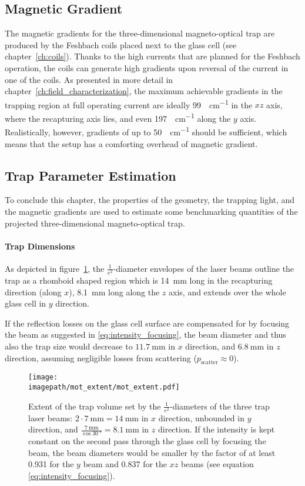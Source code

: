 \subsection*{Magnetic Gradient}
The magnetic gradients for the three-dimensional magneto-optical trap are produced by the Feshbach coils placed next to the glass cell (see chapter~\ref{ch:coils}). Thanks to the high currents that are planned for the Fesh\-bach operation, the coils can generate high gradients upon reversal of the current in one of the coils. As presented in more detail in chapter~\ref{ch:field_characterization}, the maximum achievable gradients in the trapping region at full operating current are ideally \SI{99}{\gauss\per\centi\meter} in the $xz$ axis, where the recapturing axis lies, and even \SI{197}{\gauss\per\centi\meter} along the $y$ axis. Realistically, however, gradients of up to \SI{50}{\gauss\per\centi\meter} should be sufficient, which means that the setup has a comforting overhead of magnetic gradient.

\subsection*{Trap Parameter Estimation}
To conclude this chapter, the properties of the geometry, the trapping light, and the magnetic gradients are used to estimate some benchmarking quantities of the projected three-dimensional magneto-optical trap.

\paragraph{Trap Dimensions}
As depicted in figure~\ref{fig:mot_extent}, the  $\frac{1}{e^2}$-diameter envelopes of the laser beams outline the trap as a rhomboid shaped region which is \SI[]{14}{\milli\meter} long in the recapturing direction (along $x$), \SI[]{8.1}{\milli\meter} long along the $z$ axis, and extends over the whole glass cell in $y$ direction.

If the reflection losses on the glass cell surface are compensated for by focusing the beam as suggested in \eqref{eq:intensity_focusing}, the beam diameter and thus also the trap size would decrease to $\SI[]{11.7}{\milli\meter}$ in $x$ direction, and $\SI[]{6.8}{\milli\meter}$ in $z$ direction, assuming negligible losses from scattering ($p_\text{scatter} \approx 0$).

\begin{figure}
    \centering
    \texttt{[image: \\imagepath/mot\_extent/mot\_extent.pdf]}
    \caption{Extent of the trap volume set by the $\frac{1}{e^2}$-diameters of the three trap laser beams: $2\cdot \SI[]{7}{\milli\meter} = \SI[]{14}{\milli\meter}$ in $x$ direction, unbounded in $y$ direction, and $\frac{\SI[]{7}{\milli\meter}}{\cos \SI[]{30}{\degree}} = \SI[]{8.1}{\milli\meter}$ in $z$ direction. If the intensity is kept constant on the second pass through the glass cell by focusing the beam, the beam diameters would be smaller by the factor of at least \SI{0.931}{} for the $y$ beam and \SI{0.837}{} for the $xz$ beams (see equation \ref{eq:intensity_focusing}).}
    \label{fig:mot_extent}
\end{figure}

